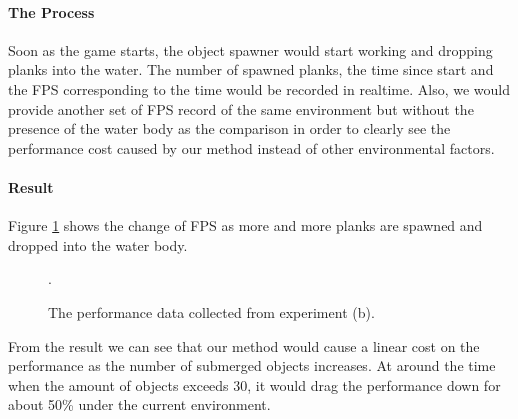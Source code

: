 \paragraph{The Process}

Soon as the game starts, the object spawner would start working and dropping planks into the water.
The number of spawned planks, the time since start and the FPS corresponding to the time would be recorded in realtime.
Also, we would provide another set of FPS record of the same environment but without the presence of the water body as the comparison in order to clearly see the performance cost caused by our method instead of other environmental factors.

\paragraph{Result}

Figure \ref{experiment-spawner} shows the change of FPS as more and more planks are spawned and dropped into the water body.

\begin{figure}[htb]
	\centering
	\caption{The performance data collected from experiment (b).}.
	\label{experiment-spawner}
\end{figure}

From the result we can see that our method would cause a linear cost on the performance as the number of submerged objects increases.
At around the time when the amount of objects exceeds 30, it would drag the performance down for about 50\% under the current environment.


